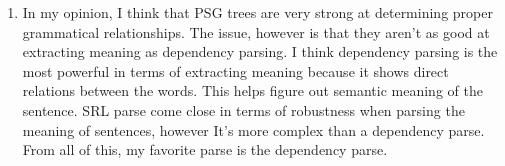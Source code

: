 \documentclass{article}
\begin{document}
\begin{enumerate}
	\item In my opinion, I think that PSG trees are very strong at determining proper grammatical relationships. The issue, however is that they aren't as good at extracting meaning as dependency parsing. I think dependency parsing is the most powerful in terms of extracting meaning because it shows direct relations between the words. This helps figure out semantic meaning of the sentence. SRL parse come close in terms of robustness when parsing the meaning of sentences, however It's more complex than a dependency parse. From all of this, my favorite parse is the dependency parse.


\end{enumerate}
\end{document}
